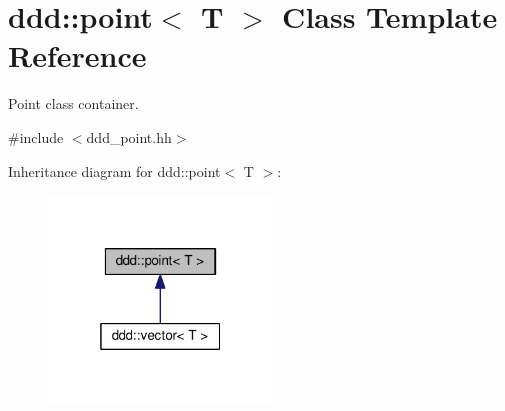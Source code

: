 \hypertarget{classddd_1_1point}{}\section{ddd\+:\+:point$<$ T $>$ Class Template Reference}
\label{classddd_1_1point}


Point class container.  




{\ttfamily \#include $<$ddd\+\_\+point.\+hh$>$}



Inheritance diagram for ddd\+:\+:point$<$ T $>$\+:\nopagebreak
\begin{figure}[H]
\begin{center}
\leavevmode
\includegraphics[width=169pt]{d1/d9e/classddd_1_1point__inherit__graph}
\end{center}
\end{figure}
